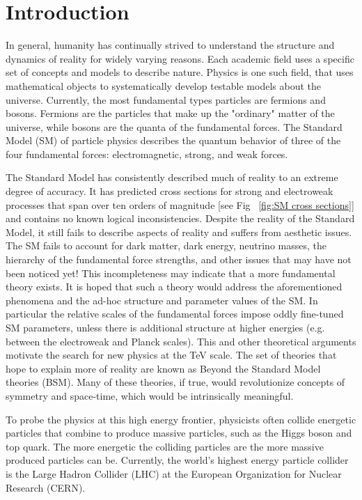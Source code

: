 \chapter{Introduction}
In general, humanity has continually strived to understand the structure and dynamics of reality for widely varying reasons. Each academic field uses a specific set of concepts and models to describe nature. Physics is one such field, that uses mathematical objects to systematically develop testable models about the universe. Currently, the most fundamental types particles are fermions and bosons. Fermions are the particles that make up the "ordinary" matter of the universe, while bosons are the quanta of the fundamental forces. The Standard Model (SM) of particle physics describes the quantum behavior of three of the four fundamental forces: electromagnetic, strong, and weak forces. 

The Standard Model has consistently described much of reality to an extreme degree of accuracy. It has predicted cross sections for strong and electroweak processes that span over ten orders of magnitude [see Fig ~\ref{fig:SM cross sections}] and contains no known logical inconsistencies. Despite the reality of the Standard Model, it still fails to describe aspects of reality and suffers from aesthetic issues. 
The SM fails to account for dark matter, dark energy, neutrino masses, the hierarchy of the fundamental force strengths, and other issues that may have not been noticed yet! This incompleteness may indicate that a more fundamental theory exists. It is hoped that such a theory would address the aforementioned phenomena and the ad-hoc structure and parameter values of the SM. In particular the relative scales of the fundamental forces impose oddly fine-tuned SM parameters, unless there is additional structure at higher energies (e.g. between the electroweak and Planck scales). This and other theoretical arguments motivate the search for new physics at the TeV scale. The set of theories that hope to explain more of reality are known as Beyond the Standard Model theories (BSM). Many of these theories, if true, would revolutionize concepts of symmetry and space-time, which would be intrinsically meaningful.

To probe the physics at this high energy frontier, physicists often collide energetic particles that combine to produce massive particles, such as the Higgs boson and top quark. The more energetic the colliding particles are the more massive produced particles can be. Currently, the world's highest energy particle collider is the Large Hadron Collider (LHC) at the European Organization for Nuclear Research (CERN). 

